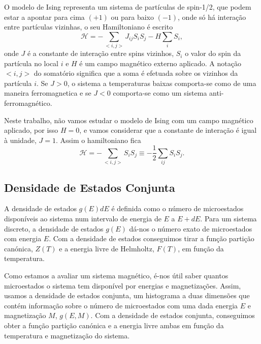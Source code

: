 \documentclass[12pt, a4paper]{article}
\begin{document}
	
	O modelo de Ising representa um sistema de partículas de spin-1/2, que podem estar a apontar para cima $(+1)$ ou para baixo $(-1)$, onde só há interação entre partículas vizinhas, o seu Hamiltoniano é escrito 
\begin{equation}
	\mathcal{H} = -\sum_{<i,j>} J_{ij} S_i S_j - H \sum_iS_i,
\end{equation}
onde $J$ é a constante de interação entre spins vizinhos, $S_i$ o valor do spin da partícula no local $i$ e $H$ é um campo magnético externo aplicado. A notação $<i,j>$ do somatório significa que a soma é efetuada sobre os vizinhos da partícula $i$. Se $J>0$, o sistema a temperaturas baixas comporta-se como de uma maneira ferromagnetica e se $J<0$ comporta-se como um sistema anti-ferromagnético.

	Neste trabalho, não vamos estudar o modelo de Ising com um campo magnético aplicado, por isso $H=0$, e vamos considerar que a constante de interação é igual à unidade, $J=1$. Assim o hamiltoniano fica
\begin{equation}
	\mathcal{H} = -\sum_{<i,j>} S_i S_j \equiv -\frac{1}{2} \sum_{ij} S_i S_j.
\end{equation}

	\subsection{Densidade de Estados Conjunta}

	A densidade de estados $g(E)dE$ é definida como o número de microestados disponíveis ao sistema num intervalo de energia de $E$ a $E + dE$. Para um sistema discreto, a densidade de estados $g(E)$ dá-nos o número exato de microestados com energia $E$. Com a densidade de estados conseguimos tirar a função partição canónica, $Z(T)$ e a energia livre de Helmholtz, $F(T)$, em função da temperatura.
	
	Como estamos a avaliar um sistema magnético, é-nos útil saber quantos microestados o sistema tem disponível por energias e magnetizações. Assim, usamos a densidade de estados conjunta, um histograma a duas dimensões que contém informação sobre o número de microestados com uma dada energia $E$ e magnetização $M$, $g(E, M)$. Com a densidade de estados conjunta, conseguimos obter a função partição canónica e a energia livre ambas em função da temperatura e magnetização do sistema.
	
\end{document}
